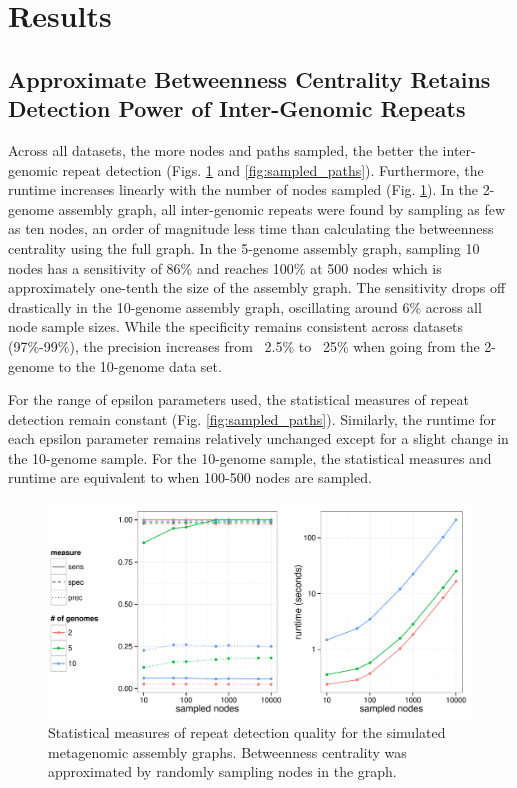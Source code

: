 \documentclass[runningheads,a4paper]{llncs}
\begin{document}
\section{Results} 


\subsection*{Approximate Betweenness Centrality Retains Detection Power of Inter-Genomic Repeats}

Across all datasets, the more nodes and paths sampled, the better the inter-genomic repeat detection (Figs. \ref{fig:sampled_nodes} and \ref{fig:sampled_paths}).
Furthermore, the runtime increases linearly with the number of nodes sampled (Fig. \ref{fig:sampled_nodes}).
In the 2-genome assembly graph, all inter-genomic repeats were found by sampling as few as ten nodes, an order of magnitude less time than calculating the betweenness centrality using the full graph.
In the 5-genome assembly graph, sampling 10 nodes has a sensitivity of 86\% and reaches 100\% at 500 nodes which is approximately one-tenth the size of the assembly graph.
The sensitivity drops off drastically in the 10-genome assembly graph, oscillating around 6\% across all node sample sizes.
While the specificity remains consistent across datasets (97\%-99\%), the precision increases from ~2.5\% to ~25\% when going from the 2-genome to the 10-genome data set.

For the range of epsilon parameters used, the statistical measures of repeat detection remain constant (Fig. \ref{fig:sampled_paths}).
Similarly, the runtime for each epsilon parameter remains relatively unchanged except for a slight change in the 10-genome sample.
For the 10-genome sample, the statistical measures and runtime are equivalent to when 100-500 nodes are sampled.

\begin{figure}[htbp]
\centering
\includegraphics[width = \textwidth]{sampled_nodes}
\caption{Statistical measures of repeat detection quality for the simulated metagenomic assembly graphs. Betweenness centrality was approximated by randomly sampling nodes in the graph.}
\label{fig:sampled_nodes}
\end{figure}
\end{document}
